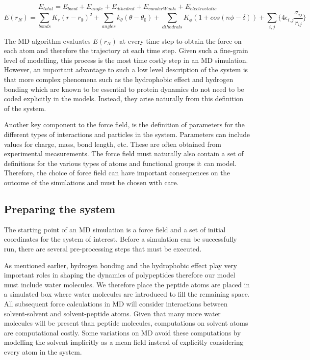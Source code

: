 \begin{equation}
E_{total} = E_{bond} + E_{angle} + E_{dihedral} + E_{van der Waals} + E_{electrostatic} 
\end{equation}
\begin{equation}
E(r_{N}) = \sum_{bonds} K_{r} (r - r_{0})^2	 + \sum_{angles} k_{\theta} (\theta - \theta_0) + \sum_{dihedrals} K_{\phi} (1 + cos(n\phi - \delta)) + \sum_{i,j} \{ 4\epsilon_{i,j} \frac{\sigma_{ij}}{r_{ij}} \}
\end{equation}

The MD algorithm evaluates $E(r_{N})$ at every time step to obtain the force on each atom and therefore the trajectory at each time step. Given such a fine-grain level of modelling, this process is the most time costly step in an MD simulation. However, an important advantage to such a low level description of the system is that more complex phenomena such as the hydrophobic effect and hydrogen bonding which are known to be essential to protein dynamics do not need to be coded explicitly in the models. Instead, they arise naturally from this definition of the system.

Another key component to the force field, is the definition of parameters for the different types of interactions and particles in the system. Parameters can include values for charge, mass, bond length, etc. These are often obtained from experimental measurements. The force field must naturally also contain a set of definitions for the various types of atoms and functional groups it can model. Therefore, the choice of force field can have important consequences on the outcome of the simulations and must be chosen with care.

\subsection{Preparing the system}

The starting point of an MD simulation is a force field and a set of initial coordinates for the system of interest. Before a simulation can be successfully run, there are several pre-processing steps that must be executed. 

As mentioned earlier, hydrogen bonding and the hydrophobic effect play very important roles in shaping the dynamics of polypeptides therefore our model must include water molecules. We therefore place the peptide atoms are placed in a simulated box where water molecules are introduced to fill the remaining space. All subsequent force calculations in MD will consider interactions between solvent-solvent and solvent-peptide atoms. Given that many more water molecules will be present than peptide molecules, computations on solvent atoms are computational costly. Some variations on MD avoid these computations by modelling the solvent implicitly as a mean field instead of explicitly considering every atom in the system. 

